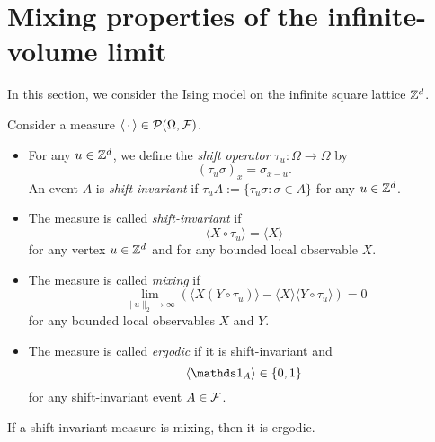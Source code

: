 \section{Mixing properties of the infinite-volume limit}

In this section, we consider the Ising model on the infinite square lattice $\mathbb Z^d$.

\begin{definition}
    Consider a measure $\langle\,\cdot\,\rangle\in\mathcal P(\Omega,\mathcal F)$.
    \begin{itemize}
        \item For any $u\in\mathbb Z^d$, we define the \emph{shift operator} $\tau_u:\Omega\to\Omega$ by
        \[
            (\tau_u\sigma)_x = \sigma_{x-u}.
        \]
        An event $A$ is \emph{shift-invariant} if $\tau_uA:=\{\tau_u\sigma:\sigma\in A\}$ for any $u\in\mathbb Z^d$.
        \item The measure is called \emph{shift-invariant} if
        \[
            \langle X\circ\tau_u \rangle = \langle X\rangle
        \]
        for any vertex $u\in\mathbb Z^d$ and
        for any bounded local observable $X$.
        \item The measure is called \emph{mixing} if
        \[
            \lim_{\|u\|_2\to\infty}
            \left(\langle X(Y\circ\tau_u)\rangle-\langle X\rangle\langle Y\circ\tau_u\rangle\right)
            =0
        \]
        for any bounded local observables $X$ and $Y$.
        \item The measure is called \emph{ergodic}
        if it is shift-invariant
        and
        \[\langle\ind{A}\rangle\in\{0,1\}\]
        for any shift-invariant event $A\in\mathcal F$.
    \end{itemize}
\end{definition}

\begin{lemma}
    If a shift-invariant measure is mixing, then it is ergodic.
\end{lemma}

